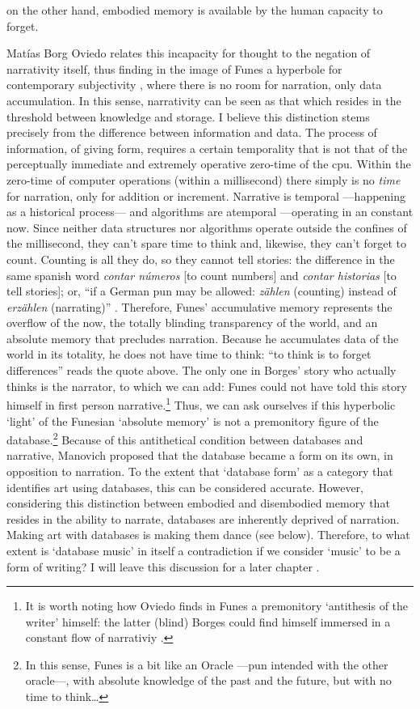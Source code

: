 on the other hand, embodied memory is available by the human capacity to forget.

Matías Borg Oviedo \parencite{Ovi19:Mem} relates this incapacity for thought to the negation of narrativity itself, thus finding in the image of Funes a hyperbole for contemporary subjectivity \parencite[5]{Ovi19:Mem}, where there is no room for narration, only data accumulation. In this sense, narrativity can be seen as that which resides in the threshold between knowledge and storage. I believe this distinction stems precisely from the difference between information and data. The process of information, of giving form, requires a certain temporality that is not that of the perceptually immediate and extremely operative zero-time of the \gls{cpu}. Within the zero-time of computer operations (within a millisecond) there simply is no \textit{time} for narration, only for addition or increment. Narrative is temporal ---happening as a historical process--- and algorithms are atemporal ---operating in an constant now. Since neither data structures nor algorithms operate outside the confines of the millisecond, they can't spare time to think and, likewise, they can't forget to count. Counting is all they do, so they cannot tell stories: the difference in the same spanish word \textit{contar números} [to count numbers] and \textit{contar historias} [to tell stories]; or, ``if a German pun may be allowed: \textit{zählen} (counting) instead of \textit{erzählen} (narrating)'' \textcite[128]{Ern13:Dig}. Therefore, Funes' accumulative memory represents the overflow of the now, the totally blinding transparency of the world, and an absolute memory that precludes narration. Because he accumulates data of the world in its totality, he does not have time to think: ``to think is to forget differences'' reads the quote above. The only one in Borges' story who actually thinks is the narrator, to which we can add: Funes could not have told this story himself in first person narrative.\footnote{It is worth noting how Oviedo finds in Funes a premonitory `antithesis of the writer' himself: the latter (blind) Borges could find himself immersed in a constant flow of narrativiy \parencite{Ovi19:Mem}.} Thus, we can ask ourselves if this hyperbolic `light' of the Funesian `absolute memory' is not a premonitory figure of the database.\footnote{In this sense, Funes is a bit like an Oracle ---pun intended with the other \gls{oracle}---, with absolute knowledge of the past and the future, but with no time to think\dots} Because of this antithetical condition between databases and narrative, Manovich proposed that the database became a form on its own, in opposition to narration. To the extent that `database form' as a category that identifies art using databases, this can be considered accurate. However, considering this distinction between embodied and disembodied memory that resides in the ability to narrate, databases are inherently deprived of narration. Making art with databases is making them dance (see below). Therefore, to what extent is `database music' in itself a contradiction if we consider `music' to be a form of writing? I will leave this discussion for a later chapter .


